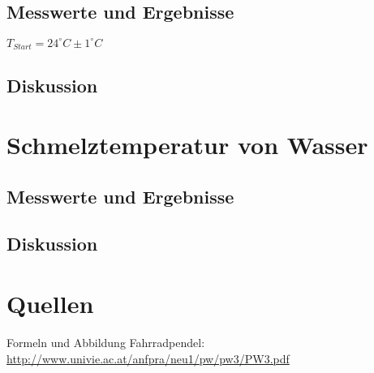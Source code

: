 \documentclass[12pt,a4paper]{article}
\begin{document}
\begin{multicols}{2}
\subsection{Messwerte und Ergebnisse}
$T_{Start} = 24^{\circ}C \pm 1^{\circ}C$\\


\subsection{Diskussion}

\section{Schmelztemperatur von Wasser}

\subsection{Messwerte und Ergebnisse}

\subsection{Diskussion}

\section{Quellen}
Formeln und Abbildung Fahrradpendel:\\
\url{http://www.univie.ac.at/anfpra/neu1/pw/pw3/PW3.pdf}\\


\end{multicols}
\end{document}
